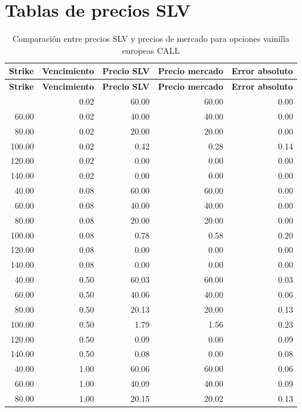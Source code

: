 \clearpage
\chapter{Tablas de precios SLV}

\begingroup
\scriptsize
\renewcommand{\arraystretch}{0.82}
\setlength{\tabcolsep}{4pt}
\begin{longtable}{@{}rrrrr@{}}
\caption{Comparación entre precios SLV y precios de mercado para opciones vainilla europeas CALL}\label{tab:slv_vs_bs_call}\\
\toprule
\textbf{Strike} & \textbf{Vencimiento} & \textbf{Precio SLV} & \textbf{Precio mercado} & \textbf{Error absoluto} \\
\midrule
\endfirsthead
\toprule
\textbf{Strike} & \textbf{Vencimiento} & \textbf{Precio SLV} & \textbf{Precio mercado} & \textbf{Error absoluto} \\
\midrule
\endhead
\bottomrule
\endlastfoot
40.00  & 0.02  & 60.00 & 60.00 & 0.00 \\
60.00  & 0.02  & 40.00 & 40.00 & 0.00 \\
80.00  & 0.02  & 20.00 & 20.00 & 0.00 \\
100.00 & 0.02  & 0.42  & 0.28  & 0.14 \\
120.00 & 0.02  & 0.00  & 0.00  & 0.00 \\
140.00 & 0.02  & 0.00  & 0.00  & 0.00 \\
40.00  & 0.08  & 60.00 & 60.00 & 0.00 \\
60.00  & 0.08  & 40.00 & 40.00 & 0.00 \\
80.00  & 0.08  & 20.00 & 20.00 & 0.00 \\
100.00 & 0.08  & 0.78  & 0.58  & 0.20 \\
120.00 & 0.08  & 0.00  & 0.00  & 0.00 \\
140.00 & 0.08  & 0.00  & 0.00  & 0.00 \\
40.00  & 0.50  & 60.03 & 60.00 & 0.03 \\
60.00  & 0.50  & 40.06 & 40.00 & 0.06 \\
80.00  & 0.50  & 20.13 & 20.00 & 0.13 \\
100.00 & 0.50  & 1.79  & 1.56  & 0.23 \\
120.00 & 0.50  & 0.09  & 0.00  & 0.09 \\
140.00 & 0.50  & 0.08  & 0.00  & 0.08 \\
40.00  & 1.00  & 60.06 & 60.00 & 0.06 \\
60.00  & 1.00  & 40.09 & 40.00 & 0.09 \\
80.00  & 1.00  & 20.15 & 20.02 & 0.13 \\

\end{longtable}
